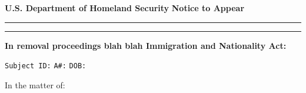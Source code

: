 \documentclass[11pt,letterpaper]{article}
\begin{document}
\noindent
\textbf{U.S. Department of Homeland Security}
\hfill
\textbf{Notice to Appear}

\vspace{6pt}

\noindent\rule{\textwidth}{6pt}

\vspace{2pt}

\noindent\rule{\textwidth}{1.5pt}

\vspace{14pt}

\noindent
\textbf{In removal proceedings blah blah Immigration and Nationality Act:}

\vspace{18pt}

\texttt{Subject ID:}
\hfill
\texttt{A\#:}
\hfill
\texttt{DOB:}

\vspace{24pt}

In the matter of:
\end{document}
